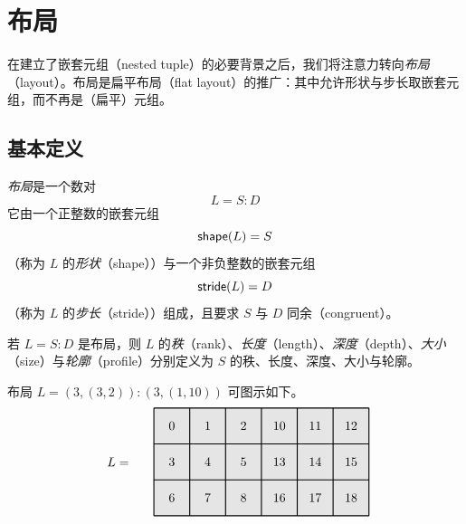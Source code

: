 
\section{布局}\label{layoutssection}

在建立了嵌套元组（nested tuple）的必要背景之后，我们将注意力转向{\it 布局}（layout）。布局是扁平布局（flat layout）的推广：其中允许形状与步长取嵌套元组，而不再是（扁平）元组。

\subsection{基本定义}

\begin{definition}\label{definitionofnestedlayout}
    {\it 布局}是一个数对
    \[
    L = S:D
    \]
    它由一个正整数的嵌套元组
    \[\mathsf{shape}(L) = S\]（称为 $L$ 的{\it 形状}（shape））与一个非负整数的嵌套元组
    \[
    \mathsf{stride}(L) = D
    \]
    （称为 $L$ 的{\it 步长}（stride））组成，且要求 $S$ 与 $D$ 同余（congruent）。
\end{definition}

\begin{definition} 若 $L=S:D$ 是布局，则 $L$ 的{\it 秩}（rank）、{\it 长度}（length）、{\it 深度}（depth）、{\it 大小}（size）与{\it 轮廓}（profile）分别定义为 $S$ 的秩、长度、深度、大小与轮廓。
\end{definition}

\begin{example} 布局 $L = (3,(3,2)):(3,(1,10))$ 可图示如下。
\[
\begin{tikzpicture}[x={(0cm,-1cm)},y={(1cm,0cm)},every node/.style={minimum size=1cm, outer sep=0pt}]

\node[fill=gray!20] at (0,0) {0};
\node[fill=gray!20] at (0,1) {1};
\node[fill=gray!20] at (0,2) {2};
\node[fill=gray!20] at (0,3) {10};
\node[fill=gray!20] at (0,4) {11};
\node[fill=gray!20] at (0,5) {12};
\node[fill=gray!20] at (1,0) {3};
\node[fill=gray!20] at (1,1) {4};
\node[fill=gray!20] at (1,2) {5};
\node[fill=gray!20] at (1,3) {13};
\node[fill=gray!20] at (1,4) {14};
\node[fill=gray!20] at (1,5) {15};
\node[fill=gray!20] at (2,0) {6};
\node[fill=gray!20] at (2,1) {7};
\node[fill=gray!20] at (2,2) {8};
\node[fill=gray!20] at (2,3) {16};
\node[fill=gray!20] at (2,4) {17};
\node[fill=gray!20] at (2,5) {18};
\draw[color=black,thick,shift={(-0.5,-0.5)}] (0,0) grid (3,6);

\node[anchor = east] at (1,-1) {$L = $};
\end{tikzpicture}
\]
\end{example}

